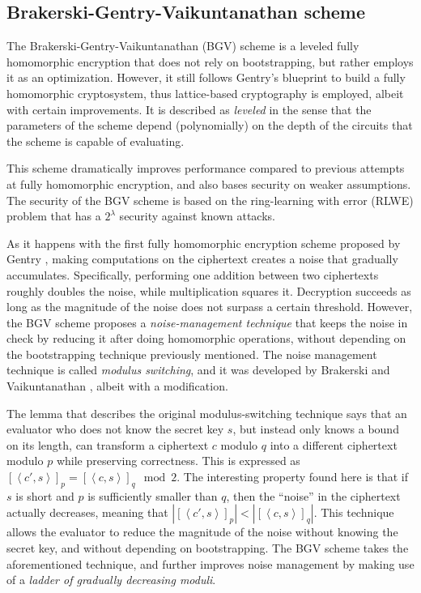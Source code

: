 \subsection{Brakerski-Gentry-Vaikuntanathan scheme}

The Brakerski-Gentry-Vaikuntanathan (BGV) scheme \cite{cryptoeprint:2011:277} is a leveled fully homomorphic encryption that does not rely on bootstrapping, but rather employs it as an optimization. However, it still follows Gentry's blueprint to build a fully homomorphic cryptosystem, thus lattice-based cryptography is employed, albeit with certain improvements. It is described as \emph{leveled} in the sense that the parameters of the scheme depend (polynomially) on the depth of the circuits that the scheme is capable of evaluating.

This scheme dramatically improves performance compared to previous attempts at fully homomorphic encryption, and also bases security on weaker assumptions. The security of the BGV scheme is based on the ring-learning with error (RLWE) problem that has a $2^{\lambda}$ security against known attacks.

As it happens with the first fully homomorphic encryption scheme proposed by Gentry \cite{homoenc}, making computations on the ciphertext creates a noise that gradually accumulates. Specifically, performing one addition between two ciphertexts roughly doubles the noise, while multiplication squares it. Decryption succeeds as long as the magnitude of the noise does not surpass a certain threshold. However, the BGV scheme proposes a \emph{noise-management technique} that keeps the noise in check by reducing  it after doing homomorphic operations, without depending on the bootstrapping technique previously mentioned. The noise management technique is called \emph{modulus switching}, and it was developed by Brakerski and Vaikuntanathan \cite{cryptoeprint:2011:344}, albeit with a modification. 

The lemma that describes the original modulus-switching technique says that an evaluator who does not know the secret key $s$, but instead only knows a bound on its length, can transform a ciphertext $c$ modulo $q$ into a different ciphertext modulo $p$ while preserving correctness. This is expressed as $[\left \langle c',s \right \rangle]_{p} = [\left \langle c,s  \right \rangle]_{q} \mod 2$. The interesting property found here is that if $s$ is short and $p$ is sufficiently smaller than $q$, then the ``noise'' in the ciphertext actually decreases, meaning that $|[\left \langle c',s \right \rangle]_{p}| < |[\left \langle c,s \right \rangle]_{q}|$. This technique allows the evaluator to reduce the magnitude of the noise without knowing the secret key, and without depending on bootstrapping. The BGV scheme takes the aforementioned technique, and further improves noise management by making use of a \emph{ladder of gradually decreasing moduli}.  

